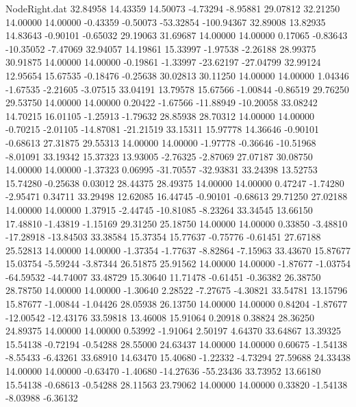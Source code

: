 \begin{filecontents}{NodeRight.dat}
  32.84958   14.43359   14.50073    -4.73294   -8.95881   29.07812   32.21250   14.00000   14.00000   -0.43359   -0.50073  -53.32854 -100.94367
  32.89008   13.82935   14.83643    -0.90101   -0.65032   29.19063   31.69687   14.00000   14.00000    0.17065   -0.83643  -10.35052   -7.47069
  32.94057   14.19861   15.33997    -1.97538   -2.26188   28.99375   30.91875   14.00000   14.00000   -0.19861   -1.33997  -23.62197  -27.04799
  32.99124   12.95654   15.67535    -0.18476   -0.25638   30.02813   30.11250   14.00000   14.00000    1.04346   -1.67535   -2.21605   -3.07515
  33.04191   13.79578   15.67566    -1.00844   -0.86519   29.76250   29.53750   14.00000   14.00000    0.20422   -1.67566  -11.88949  -10.20058
  33.08242   14.70215   16.01105    -1.25913   -1.79632   28.85938   28.70312   14.00000   14.00000   -0.70215   -2.01105  -14.87081  -21.21519
  33.15311   15.97778   14.36646    -0.90101   -0.68613   27.31875   29.55313   14.00000   14.00000   -1.97778   -0.36646  -10.51968   -8.01091
  33.19342   15.37323   13.93005    -2.76325   -2.87069   27.07187   30.08750   14.00000   14.00000   -1.37323    0.06995  -31.70557  -32.93831
  33.24398   13.52753   15.74280    -0.25638    0.03012   28.44375   28.49375   14.00000   14.00000    0.47247   -1.74280   -2.95471    0.34711
  33.29498   12.62085   16.44745    -0.90101   -0.68613   29.71250   27.02188   14.00000   14.00000    1.37915   -2.44745  -10.81085   -8.23264
  33.34545   13.66150   17.48810    -1.43819   -1.15169   29.31250   25.18750   14.00000   14.00000    0.33850   -3.48810  -17.28918  -13.84503
  33.38584   15.37354   15.77637    -0.75776   -0.61451   27.67188   25.52813   14.00000   14.00000   -1.37354   -1.77637   -8.82864   -7.15963
  33.43670   15.87677   15.03754    -5.59244   -3.87344   26.51875   25.91562   14.00000   14.00000   -1.87677   -1.03754  -64.59532  -44.74007
  33.48729   15.30640   11.71478    -0.61451   -0.36382   26.38750   28.78750   14.00000   14.00000   -1.30640    2.28522   -7.27675   -4.30821
  33.54781   13.15796   15.87677    -1.00844   -1.04426   28.05938   26.13750   14.00000   14.00000    0.84204   -1.87677  -12.00542  -12.43176
  33.59818   13.46008   15.91064     0.20918    0.38824   28.36250   24.89375   14.00000   14.00000    0.53992   -1.91064    2.50197    4.64370
  33.64867   13.39325   15.54138    -0.72194   -0.54288   28.55000   24.63437   14.00000   14.00000    0.60675   -1.54138   -8.55433   -6.43261
  33.68910   14.63470   15.40680    -1.22332   -4.73294   27.59688   24.33438   14.00000   14.00000   -0.63470   -1.40680  -14.27636  -55.23436
  33.73952   13.66180   15.54138    -0.68613   -0.54288   28.11563   23.79062   14.00000   14.00000    0.33820   -1.54138   -8.03988   -6.36132

\end{filecontents}
